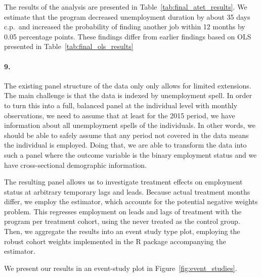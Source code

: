 \documentclass{scrartcl}
\begin{document}
The results of the analysis are presented in Table~\ref{tab:final_atet_results}. We estimate that the program decreased unemployment duration by about 35 days c.p.\ and increased the probability of finding another job within 12 months by 0.05 percentage points. These findings differ from earlier findings based on OLS presented in Table~\ref{tab:final_ols_results}



\paragraph*{9.}

The existing panel structure of the data only only allows for limited extensions. The main challenge is that the data is indexed by unemployment spell. In order to turn this into a full, balanced panel at the individual level with monthly observations, we need to assume that at least for the 2015 period, we have information about all unemployment spells of the individuals. In other words, we should be able to safely assume that any period not covered in the data means the individual is employed. Doing that, we are able to transform the data into such a panel where the outcome variable is the binary employment status and we have cross-sectional demographic information.

The resulting panel allows us to investigate treatment effects on employment status at arbitrary temporary lags and leads. Because actual treatment months differ, we employ the \cite{callawayDifferenceinDifferencesMultipleTime2020} estimator, which accounts for the potential negative weights problem. This regresses employment on leads and lags of treatment with the program per treatment cohort, using the never treated as the control group. Then, we aggregate the results into an event study type plot, employing the robust cohort weights implemented in the R package accompanying the estimator. 

We present our results in an event-study plot in Figure~\ref{fig:event_studies}. 
\end{document}
